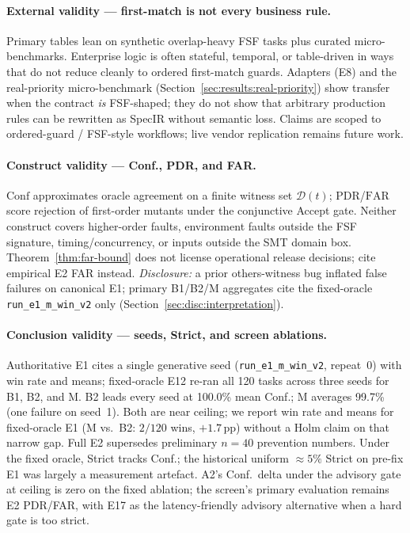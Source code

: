 \paragraph{External validity --- first-match is not every business rule.}
Primary tables lean on synthetic overlap-heavy FSF tasks plus curated
micro-benchmarks.
Enterprise logic is often stateful, temporal, or table-driven in ways that do
not reduce cleanly to ordered first-match guards.
Adapters (E8) and the real-priority micro-benchmark
(Section~\ref{sec:results:real-priority}) show transfer when the contract
\emph{is} FSF-shaped; they do not show that arbitrary production rules can be
rewritten as SpecIR without semantic loss.
Claims are scoped to ordered-guard / FSF-style workflows; live vendor
replication remains future work.

\paragraph{Construct validity --- Conf., PDR, and FAR.}
$\mathrm{Conf}$ approximates oracle agreement on a finite witness set
$\mathcal{D}(t)$; $\mathrm{PDR}$/$\mathrm{FAR}$ score rejection of
first-order mutants under the conjunctive Accept gate.
Neither construct covers higher-order faults, environment faults outside the
FSF signature, timing/concurrency, or inputs outside the SMT domain box.
Theorem~\ref{thm:far-bound} does not license operational release decisions;
cite empirical E2 FAR instead.
\emph{Disclosure:} a prior others-witness bug inflated false failures on
canonical E1; primary B1/B2/M aggregates cite the fixed-oracle
\texttt{run\_e1\_m\_win\_v2} only
(Section~\ref{sec:disc:interpretation}).

\paragraph{Conclusion validity --- seeds, Strict, and screen ablations.}
Authoritative E1 cites a single generative seed (\texttt{run\_e1\_m\_win\_v2},
repeat~0) with win rate and means; fixed-oracle E12 re-ran all 120 tasks
across three seeds for B1, B2, and M.
B2 leads every seed at 100.0\% mean Conf.; M averages 99.7\% (one failure on
seed~1).
Both are near ceiling; we report win rate and means for fixed-oracle E1
(M vs.\ B2: $2/120$ wins, ${+}1.7$\,pp) without a Holm claim on that narrow
gap.
Full E2 supersedes preliminary $n{=}40$ prevention numbers.
Under the fixed oracle, Strict tracks Conf.; the historical uniform
${\approx}5\%$ Strict on pre-fix E1 was largely a measurement artefact.
A2's Conf.\ delta under the advisory gate at ceiling is zero on the fixed
ablation; the screen's primary evaluation remains E2 PDR/FAR, with E17 as the
latency-friendly advisory alternative when a hard gate is too strict.


